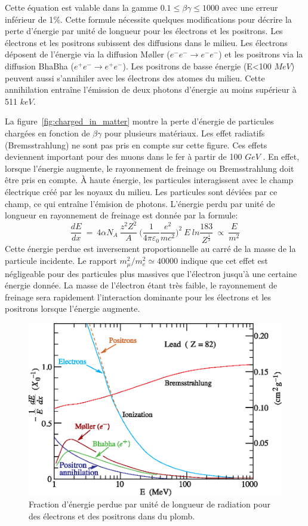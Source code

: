 Cette équation est valable dans la gamme $0.1\leq\beta\gamma\leq1000$ avec une erreur inférieur de 1$\%$. Cette formule nécessite quelques modifications pour décrire la perte d'énergie par unité de longueur pour les électrons et les positrons. Les électrons et les positrons subissent des diffusions dans le milieu. Les électrons déposent de l'énergie via la diffusion M{\o}ller ($e^-e^-\rightarrow e^-e^-$) et les positrons via la diffusion BhaBha ($e^+e^-\rightarrow e^+e^-$). Les positrons de basse énergie (E<100 $MeV$) peuvent aussi s'annihiler avec les électrons des atomes du milieu. Cette annihilation entraîne l'émission de deux photons d'énergie au moins supérieur à 511 $keV$.

La figure~\ref{fig:charged_in_matter} montre la perte d'énergie de particules chargées en fonction de $\beta\gamma$ pour plusieurs matériaux. Les effet radiatifs (Bremsstrahlung) ne sont pas pris en compte sur cette figure. Ces effets deviennent important pour des muons dans le fer à partir de 100 $GeV$ \cite{pdg}. En effet, lorsque l'énergie augmente, le rayonnement de freinage ou Bremsstrahlung doit être pris en compte. À haute énergie, les particules interagissent avec le champ électrique créé par les noyaux du milieu. Les particules sont déviées par ce champ, ce qui entraîne l'émision de photons. L'énergie perdu par unité de longueur en rayonnement de freinage est donnée par la formule:
\begin{equation}
  \frac{dE}{dx}~=~4\alpha N_A~\frac{z^2Z^2}{A}~\big(\frac{1}{4\pi\varepsilon_0}\frac{e^2}{mc^2}\big)^2~E~ln\frac{183}{Z^{\frac{1}{3}}}~\propto~\frac{E}{m^2}
\end{equation}
Cette énergie perdue est inversement proportionnelle au carré de la masse de la particule incidente. Le rapport $m_{\mu}^2/m_e^2\simeq40000$ indique que cet effet est négligeable pour des particules plus massives que l'électron jusqu'à une certaine énergie donnée. La masse de l'électron étant très faible, le rayonnement de freinage sera rapidement l'interaction dominante pour les électrons et les positrons lorsque l'énergie augmente. 
\begin{figure}[!h]
  \begin{center}
    \includegraphics[width=.6\textwidth]{ShowerTh/figs/elossfrac_06.eps}
    \caption{Fraction d'énergie perdue par unité de longueur de radiation pour des électrons et des positrons dans du plomb. }
    \label{fig:electron_in_lead}
  \end{center}
\end{figure}
